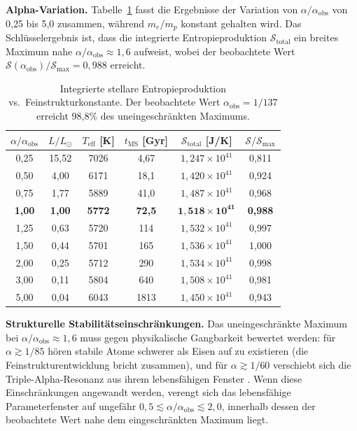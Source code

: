 \documentclass[12pt,a4paper]{article}
\theoremstyle{remark}
\begin{document}
\textbf{Alpha-Variation.} Tabelle~\ref{tab:alpha_scan} fasst die Ergebnisse der Variation von $\alpha / \alpha_{\text{obs}}$ von 0,25 bis 5,0 zusammen, w\"ahrend $m_e/m_p$ konstant gehalten wird. Das Schl\"usselergebnis ist, dass die integrierte Entropieproduktion $\mathcal{S}_{\text{total}}$ ein breites Maximum nahe $\alpha / \alpha_{\text{obs}} \approx 1{,}6$ aufweist, wobei der beobachtete Wert $\mathcal{S}(\alpha_{\text{obs}}) / \mathcal{S}_{\text{max}} = 0{,}988$ erreicht.

\begin{table}[ht]
\centering
\caption{Integrierte stellare Entropieproduktion vs.\ Feinstrukturkonstante. Der beobachtete Wert $\alpha_{\text{obs}} = 1/137$ erreicht 98,8\% des uneingeschr\"ankten Maximums.}
\label{tab:alpha_scan}
\begin{tabular}{cccccc}
\toprule
$\alpha / \alpha_{\text{obs}}$ & $L / L_\odot$ & $T_{\text{eff}}$ [K] & $t_{\text{MS}}$ [Gyr] & $\mathcal{S}_{\text{total}}$ [J/K] & $\mathcal{S} / \mathcal{S}_{\text{max}}$ \\
\midrule
0{,}25 & 15{,}52 & 7026 & 4{,}67 & $1{,}247 \times 10^{41}$ & 0{,}811 \\
0{,}50 & 4{,}00 & 6171 & 18{,}1 & $1{,}420 \times 10^{41}$ & 0{,}924 \\
0{,}75 & 1{,}77 & 5889 & 41{,}0 & $1{,}487 \times 10^{41}$ & 0{,}968 \\
\textbf{1{,}00} & \textbf{1{,}00} & \textbf{5772} & \textbf{72{,}5} & $\mathbf{1{,}518 \times 10^{41}}$ & \textbf{0{,}988} \\
1{,}25 & 0{,}63 & 5720 & 114 & $1{,}532 \times 10^{41}$ & 0{,}997 \\
1{,}50 & 0{,}44 & 5701 & 165 & $1{,}536 \times 10^{41}$ & 1{,}000 \\
2{,}00 & 0{,}25 & 5712 & 290 & $1{,}534 \times 10^{41}$ & 0{,}998 \\
3{,}00 & 0{,}11 & 5804 & 640 & $1{,}508 \times 10^{41}$ & 0{,}981 \\
5{,}00 & 0{,}04 & 6043 & 1813 & $1{,}450 \times 10^{41}$ & 0{,}943 \\
\bottomrule
\end{tabular}
\end{table}

\textbf{Strukturelle Stabilit\"atseinschr\"ankungen.} Das uneingeschr\"ankte Maximum bei $\alpha / \alpha_{\text{obs}} \approx 1{,}6$ muss gegen physikalische Gangbarkeit bewertet werden: f\"ur $\alpha \gtrsim 1/85$ h\"oren stabile Atome schwerer als Eisen auf zu existieren (die Feinstrukturentwicklung bricht zusammen), und f\"ur $\alpha \gtrsim 1/60$ verschiebt sich die Triple-Alpha-Resonanz aus ihrem lebensfähigen Fenster \citep{Adams2019}. Wenn diese Einschr\"ankungen angewandt werden, verengt sich das lebensfähige Parameterfenster auf ungef\"ahr $0{,}5 \lesssim \alpha/\alpha_{\text{obs}} \lesssim 2{,}0$, innerhalb dessen der beobachtete Wert nahe dem eingeschr\"ankten Maximum liegt.
\end{document}
